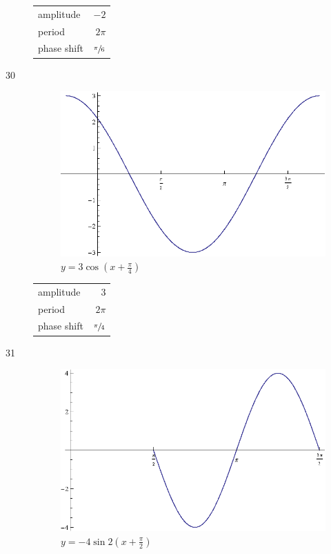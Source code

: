 \documentclass{exam}
\begin{document}
\begin{description}
        \begin{tabular}[H]{lr}
          \toprule
          amplitude   & $-2$ \\
          period      & $2 \pi$ \\
          phase shift & $\sfrac{\pi}{6}$ \\
          \bottomrule
        \end{tabular}

      \item[30]
        \begin{figure}[H]
          \centering
          \includegraphics[scale=0.8]{exercise30.eps}
          \caption{$y = 3 \cos \left( x + \frac{\pi}{4} \right)$}
        \end{figure}

        \begin{tabular}[H]{lr}
          \toprule
          amplitude   & $3$ \\
          period      & $2 \pi$ \\
          phase shift & $\sfrac{\pi}{4}$ \\
          \bottomrule
        \end{tabular}

      \item[31]
        \begin{figure}[H]
          \centering
          \includegraphics[scale=0.8]{exercise31.eps}
          \caption{$y = -4 \sin 2 \left( x + \frac{\pi}{2} \right)$}
        \end{figure}


\end{description}
\end{document}
